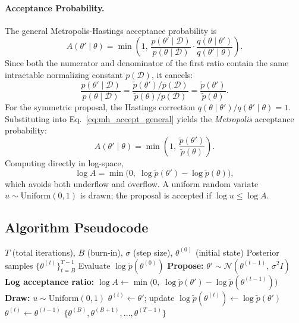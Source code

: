 \documentclass[12pt,a4paper]{article}
\newcommand{\D}{\mathcal{D}}
\newcommand{\N}{\mathcal{N}}
\newcommand{\pt}{\tilde{p}}
\begin{document}
\paragraph{Acceptance Probability.}
The general Metropolis-Hastings acceptance probability is
\begin{equation}
  A(\theta' \mid \theta)
  = \min\!\left(1,\,
    \frac{p(\theta' \mid \D)}{p(\theta \mid \D)}
    \cdot
    \frac{q(\theta \mid \theta')}{q(\theta' \mid \theta)}
    \right).
  \label{eq:mh_accept_general}
\end{equation}
Since both the numerator and denominator of the first ratio contain
the same intractable normalizing constant $p(\D)$, it cancels:
\begin{equation}
  \frac{p(\theta' \mid \D)}{p(\theta \mid \D)}
  = \frac{\pt(\theta')/p(\D)}{\pt(\theta)/p(\D)}
  = \frac{\pt(\theta')}{\pt(\theta)}.
\end{equation}
For the symmetric proposal, the Hastings correction
$q(\theta \mid \theta')/q(\theta' \mid \theta) = 1$.
Substituting into Eq.~\eqref{eq:mh_accept_general} yields the
\emph{Metropolis} acceptance probability:
\begin{equation}
  A(\theta' \mid \theta)
  = \min\!\left(1,\,\frac{\pt(\theta')}{\pt(\theta)}\right).
  \label{eq:mh_accept}
\end{equation}
Computing directly in log-space,
\begin{equation}
  \log A = \min\!\bigl(0,\;\log \pt(\theta') - \log \pt(\theta)\bigr),
  \label{eq:mh_log_accept}
\end{equation}
which avoids both underflow and overflow.
A uniform random variate $u \sim \mathrm{Uniform}(0,1)$ is drawn; the
proposal is accepted if $\log u \leq \log A$.

\subsection{Algorithm Pseudocode}

\begin{algorithm}[H]
\caption{Metropolis-Hastings MCMC}
\label{alg:mh}
\begin{algorithmic}[1]
\Require $T$ (total iterations), $B$ (burn-in), $\sigma$ (step size),
         $\theta^{(0)}$ (initial state)
\Ensure Posterior samples $\{\theta^{(t)}\}_{t=B}^{T-1}$
\State Evaluate $\log\pt(\theta^{(0)})$
  \State \textbf{Propose:} $\theta' \sim \N(\theta^{(t-1)},\,\sigma^2 I)$
  \State \textbf{Log acceptance ratio:}
         $\log A \gets \min\!\bigl(0,\;\log\pt(\theta') - \log\pt(\theta^{(t-1)})\bigr)$
  \State \textbf{Draw:} $u \sim \mathrm{Uniform}(0,1)$
    \State $\theta^{(t)} \gets \theta'$; \quad update $\log\pt(\theta^{(t)}) \gets \log\pt(\theta')$
  \Else
    \State $\theta^{(t)} \gets \theta^{(t-1)}$
  \EndIf
\EndFor
\State \Return $\{\theta^{(B)}, \theta^{(B+1)}, \ldots, \theta^{(T-1)}\}$
\end{algorithmic}
\end{algorithm}
\end{document}
